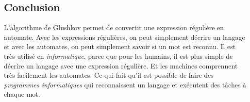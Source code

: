 \subsection{Conclusion}

L'algorithme de Glushkov permet de convertir une expression régulière en
automate. Avec les expressions régulières, on peut simplement décrire un
langage et avec les automates, on peut simplement savoir si un mot est reconnu.
Il est très utilisé en \textit{informatique}, parce que pour les humains, il
est plus simple de décrire un langage avec une expression régulière. Et les
machines comprennent très facilement les automates. Ce qui fait qu'il est
possible de faire des \textit{programmes informatiques} qui reconnaissent un
langage et exécutent des tâches à chaque mot.
